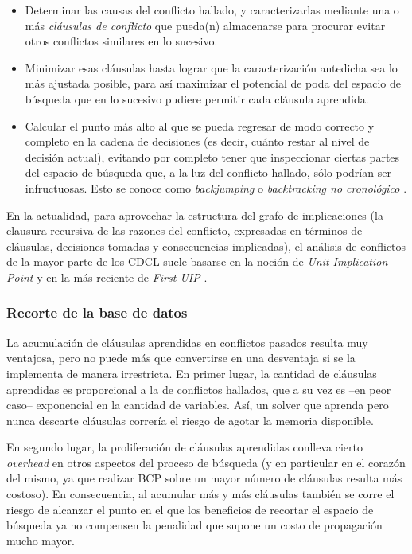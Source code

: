 \begin{itemize}

\item Determinar las causas del conflicto hallado, y caracterizarlas mediante una o más \emph{cláusulas de conflicto} que pueda(n) almacenarse para procurar evitar otros conflictos similares en lo sucesivo.

\item Minimizar esas cláusulas hasta lograr que la caracterización antedicha sea lo más ajustada posible, para así maximizar el potencial de poda del espacio de búsqueda que en lo sucesivo pudiere permitir cada cláusula aprendida. %

\item  Calcular el punto más alto al que se pueda regresar de modo correcto y completo en la cadena de decisiones (es decir, cuánto restar al nivel de decisión actual), evitando por completo tener que inspeccionar ciertas partes del espacio de búsqueda que, a la luz del conflicto hallado, sólo podrían ser infructuosas. Esto se conoce como \emph{backjumping} o \emph{backtracking no cronológico} \cite{marques-silva:iccad96,moskewicz:da01}.

\end{itemize}

En la actualidad, para aprovechar la estructura del grafo de implicaciones (la clausura recursiva de las razones del conflicto, expresadas en términos de cláusulas, decisiones tomadas y consecuencias implicadas), el análisis de conflictos de la mayor parte de los \ssolvers CDCL suele basarse en la noción de \emph{Unit Implication Point} \cite{marques-silva:iccad96} y en la más reciente de \emph{First UIP} \cite{zhang:iccad01}.


\subsubsection{Recorte de la base de datos}

La acumulación de cláusulas aprendidas en conflictos pasados resulta muy ventajosa, pero no puede más que convertirse en una desventaja si se la implementa de manera irrestricta. En primer lugar, la cantidad de cláusulas aprendidas es proporcional a la de conflictos hallados, que a su vez es --en peor caso-- exponencial en la cantidad de variables. Así, un solver que aprenda pero nunca descarte cláusulas correría el riesgo de agotar la memoria disponible.

En segundo lugar, la proliferación de cláusulas aprendidas conlleva cierto \emph{overhead} en otros aspectos del proceso de búsqueda (y en particular en el corazón del mismo, ya que realizar BCP sobre un mayor número de cláusulas resulta más costoso). En consecuencia, al acumular más y más cláusulas también se corre el riesgo de alcanzar el punto en el que los beneficios de recortar el espacio de búsqueda ya no compensen la penalidad que supone un costo de propagación mucho mayor.

